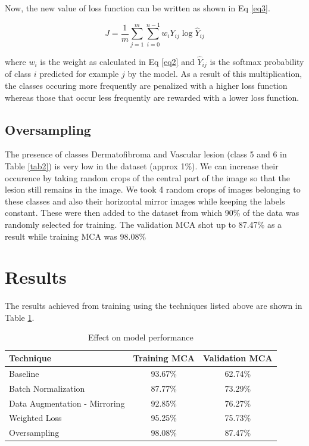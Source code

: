 \documentclass[conference]{IEEEtran}
\begin{document}
Now, the new value of loss function can be written as shown in Eq \ref{eq3}.


\begin{equation}
J = \frac{1}{m}\sum_{j=1}^{m}\sum_{i=0}^{n-1}w_iY_{ij}\log\hat{Y}_{ij}
\label{eq3}
\end{equation}

where $w_i$ is the weight as calculated in Eq \ref{eq2} and $\hat{Y}_{ij}$ is the softmax probability of class $i$ predicted for example $j$ by the model. As a result of this multiplication, the classes occuring more frequently are penalized with a higher loss function whereas those that occur less frequently are rewarded with a lower loss function. 


\subsection{Oversampling}\label{oversampling}

The presence of classes Dermatofibroma and Vascular lesion (class 5 and 6 in Table \ref{tab2}) is very low
in the dataset (approx 1\%). We can increase their
occurence by taking random crops of the central part of the image so
that the lesion still remains in the image.\cite{NIPS2012_4824} We took 4 random
crops of images belonging to these classes and also their horizontal mirror images
while keeping the labels constant. These were then added to the dataset
from which 90\% of the data was randomly selected for training. The
validation MCA shot up to 87.47\% as a result while training MCA was
98.08\%


    \section{Results}\label{results}

The results achieved from training using the techniques listed above are
shown in Table \ref{tab3}.


\begin{table}[htbp]
\caption{Effect on model performance}
\begin{center}
\begin{tabular}{|l|c|c|}
\hline
\textbf{Technique} & \textbf{Training MCA} & \textbf{Validation MCA}\\
\hline
Baseline & 93.67\% & 62.74\%\\
\hline
Batch Normalization & 87.77\% & 73.29\%\\
\hline
Data Augmentation - Mirroring & 92.85\% & 76.27\%\\
\hline
Weighted Loss & 95.25\% & 75.73\%\\
\hline
Oversampling & 98.08\% & 87.47\%\\
\hline
\end{tabular}
\label{tab3}
\end{center}
\end{table}
\end{document}

